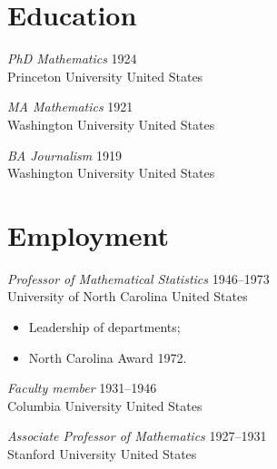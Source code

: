 \documentclass{resume}
\begin{document}
\maketitle

\section{Education}

\begin{block}{}
  \emph{PhD Mathematics} \hfill 1924 \\
  Princeton University \hfill United States
\end{block}

\begin{block}{}
  \emph{MA Mathematics} \hfill 1921 \\
  Washington University \hfill United States
\end{block}

\begin{block}{}
  \emph{BA Journalism} \hfill 1919 \\
  Washington University \hfill United States
\end{block}

\section{Employment}

\begin{block}{%
    \emph{Professor of Mathematical Statistics} \hfill 1946--1973 \\
    University of North Carolina \hfill United States}
  \begin{itemize}
  \item Leadership of departments;
  \item North Carolina Award 1972.
  \end{itemize}
\end{block}

\begin{block}{}
  \emph{Faculty member} \hfill 1931--1946 \\
  Columbia University \hfill United States
\end{block}

\begin{block}{}
  \emph{Associate Professor of Mathematics} \hfill 1927--1931 \\
  Stanford University \hfill United States
\end{block}
\end{document}
